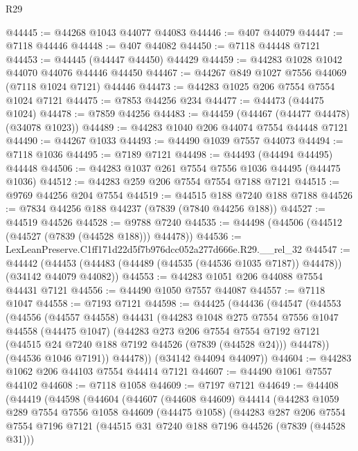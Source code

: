 \begin{lexlean}{R29}
\begin{coremodule}
@44445 := @44268 @1043 @44077 @44083
@44446 := @407 @44079
@44447 := @7118 @44446
@44448 := @407 @44082
@44450 := @7118 @44448 @7121
@44453 := @44445 (@44447 @44450) @44429
@44459 := @44283 @1028 @1042 @44070 @44076 @44446 @44450
@44467 := @44267 @849 @1027 @7556 @44069 (@7118 @1024 @7121) @44446
@44473 := @44283 @1025 @206 @7554 @7554 @1024 @7121
@44475 := @7853 @44256 @234
@44477 := @44473 (@44475 @1024)
@44478 := @7859 @44256
@44483 := @44459 (@44467 (@44477 @44478) (@34078 @1023))
@44489 := @44283 @1040 @206 @44074 @7554 @44448 @7121
@44490 := @44267 @1033
@44493 := @44490 @1039 @7557 @44073
@44494 := @7118 @1036
@44495 := @7189 @7121
@44498 := @44493 (@44494 @44495) @44448
@44506 := @44283 @1037 @261 @7554 @7556 @1036 @44495 (@44475 @1036)
@44512 := @44283 @259 @206 @7554 @7554 @7188 @7121
@44515 := @9769 @44256 @204 @7554
@44519 := @44515 @188 @7240 @188 @7188
@44526 := @7834 @44256 @188 @44237 (@7839 (@7840 @44256 @188))
@44527 := @44519 @44526
@44528 := @9788 @7240
@44535 := @44498 (@44506 (@44512 (@44527 (@7839 (@44528 @188))) @44478))
@44536 := LexLeanPreserve.C1ff171d22d5f7b976dcc052a277d666e.R29.__rel_32
@44547 := @44442
    (@44453 (@44483 (@44489 (@44535 (@44536 @1035 @7187)) @44478)) (@34142 @44079 @44082))
@44553 := @44283 @1051 @206 @44088 @7554 @44431 @7121
@44556 := @44490 @1050 @7557 @44087
@44557 := @7118 @1047
@44558 := @7193 @7121
@44598 := @44425
    (@44436
      (@44547
        (@44553
          (@44556
            (@44557 @44558)
            @44431
            (@44283
              @1048
              @275
              @7554
              @7556
              @1047
              @44558
              (@44475 @1047)
              (@44283
                @273
                @206
                @7554
                @7554
                @7192
                @7121
                (@44515 @24 @7240 @188 @7192 @44526 (@7839 (@44528 @24)))
                @44478))
            (@44536 @1046 @7191))
          @44478))
      (@34142 @44094 @44097))
@44604 := @44283 @1062 @206 @44103 @7554 @44414 @7121
@44607 := @44490 @1061 @7557 @44102
@44608 := @7118 @1058
@44609 := @7197 @7121
@44649 := @44408
    (@44419
      (@44598
        (@44604
          (@44607
            (@44608 @44609)
            @44414
            (@44283
              @1059
              @289
              @7554
              @7556
              @1058
              @44609
              (@44475 @1058)
              (@44283
                @287
                @206
                @7554
                @7554
                @7196
                @7121
                (@44515 @31 @7240 @188 @7196 @44526 (@7839 (@44528 @31)))

\end{coremodule}
\end{lexlean}
